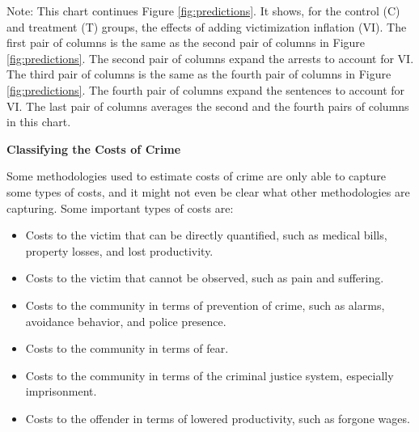 \documentclass[static]{JJH-Beamer}
\begin{document}
{\flushleft \normalsize Note: This chart continues Figure \ref{fig:predictions}. It shows, for the control (C) and treatment (T) groups, the effects of adding victimization inflation (VI). The first pair of columns is the same as the second pair of columns in Figure \ref{fig:predictions}. The second pair of columns expand the arrests to account for VI. The third pair of columns is the same as the fourth pair of columns in Figure \ref{fig:predictions}. The fourth pair of columns expand the sentences to account for VI. The last pair of columns averages the second and the fourth pairs of columns in this chart.\\}

\begin{frame}

\begin{center}
\textbf{Classifying the Costs of Crime}
\end{center}
Some methodologies used to estimate costs of crime are only able to capture some types of costs, and it might not even be clear what other methodologies are capturing. Some important types of costs are:
\begin{itemize}
\item Costs to the victim that can be directly quantified, such as medical bills, property losses, and lost productivity.
\item Costs to the victim that cannot be observed, such as pain and suffering.
\item Costs to the community in terms of prevention of crime, such as alarms, avoidance behavior, and police presence.
\item Costs to the community in terms of fear.
\item Costs to the community in terms of the criminal justice system, especially imprisonment.
\item Costs to the offender in terms of lowered productivity, such as forgone wages.
\end{itemize}

\end{frame}
\end{document}
